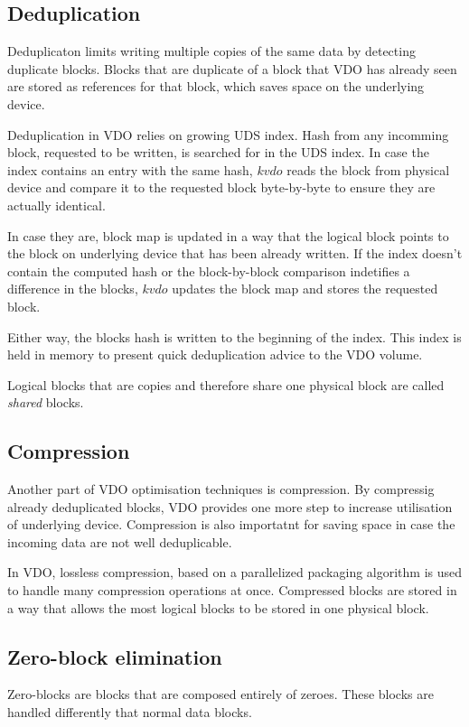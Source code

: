 \documentclass[
  color, %
  table, %
  lof,   %
  lot,   %
]{fithesis3}
\begin{document}
\subsection{Deduplication}
Deduplicaton limits writing multiple copies of the same data by detecting duplicate blocks. Blocks that are duplicate of a block that VDO has already seen are stored as references for that block, which saves space on the underlying device.

Deduplication in VDO relies on growing UDS index. Hash from any incomming block, requested to be written, is searched for in the UDS index. In case the index contains an entry with the same hash, $kvdo$ reads the block from physical device and compare it to the requested block byte-by-byte to ensure they are actually identical.

In case they are, block map is updated in a way that the logical block points to the block on underlying device that has been already written. If the index doesn't contain the computed hash or the block-by-block comparison indetifies a difference in the blocks, $kvdo$ updates the block map and stores the requested block.

Either way, the blocks hash is written to the beginning of the index. This index is held in memory to present quick deduplication advice to the VDO volume.

Logical blocks that are copies and therefore share one physical block are called \emph{shared} blocks.

\subsection{Compression}
Another part of VDO optimisation techniques is compression. By compressig already deduplicated blocks, VDO provides one more step to increase utilisation of underlying device. Compression is also importatnt for saving space in case the incoming data are not well deduplicable.

In VDO, lossless compression, based on a parallelized packaging algorithm is used to handle many compression operations at once. Compressed blocks are stored in a way that allows the most logical blocks to be stored in one physical block.


\subsection{Zero-block elimination}
Zero-blocks are blocks that are composed entirely of zeroes. These blocks are handled differently that normal data blocks.
\end{document}
